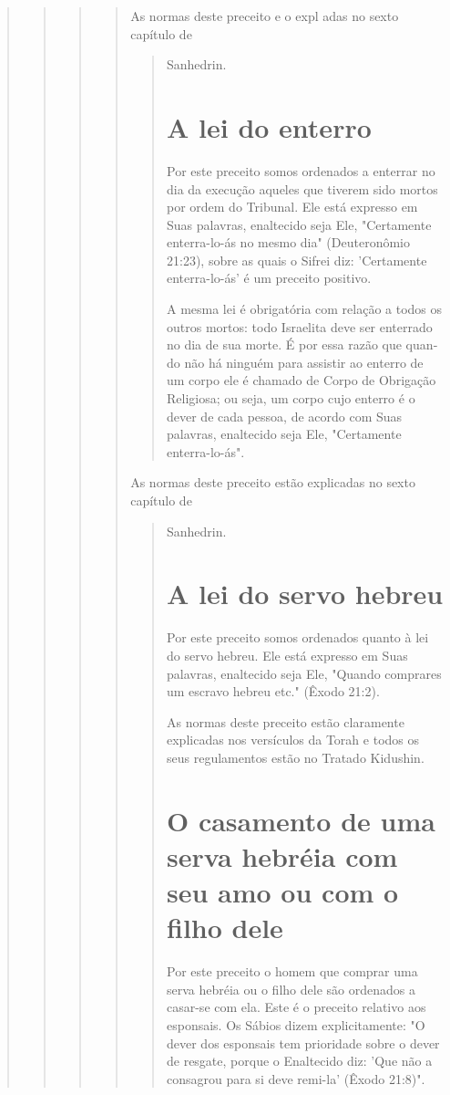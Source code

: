 \begin{quote}
\begin{quote}
\begin{quote}
\begin{quote}
As normas deste preceito e o expl adas no sexto capítulo de

\begin{quote}
Sanhedrin.

\section{A lei do enterro}

Por este preceito somos ordenados a enterrar no dia da execução aqueles
que tiverem sido mortos por ordem do Tribunal. Ele está expresso em Suas
palavras, enaltecido seja Ele, "Certamente enterra-lo-ás no mesmo dia"
(Deuteronômio 21:23), sobre as quais o Sifrei diz: 'Certamente
enterra-lo-ás' é um preceito positivo.

A mesma lei é obrigatória com relação a todos os outros mortos: to­do
Israelita deve ser enterrado no dia de sua morte. É por essa razão que
quan­do não há ninguém para assistir ao enterro de um corpo ele é
chamado de Corpo de Obrigação Religiosa; ou seja, um corpo cujo enterro
é o dever de cada pessoa, de acordo com Suas palavras, enaltecido seja
Ele, "Certamente enterra-lo-ás".
\end{quote}

As normas deste preceito estão explicadas no sexto capítulo de

\begin{quote}
Sanhedrin.

\section{A lei do servo hebreu}

Por este preceito somos ordenados quanto à lei do servo hebreu. Ele está
expresso em Suas palavras, enaltecido seja Ele, "Quando comprares um
escravo hebreu etc." (Êxodo 21:2).

As normas deste preceito estão claramente explicadas nos versícu­los da
Torah e todos os seus regulamentos estão no Tratado Kidushin.

\section{O casamento de uma serva hebréia com seu amo ou com o filho dele}

Por este preceito o homem que comprar uma serva hebréia ou o fi­lho dele
são ordenados a casar-se com ela. Este é o preceito relativo aos
espon­sais. Os Sábios dizem explicitamente: "O dever dos esponsais tem
prioridade sobre o dever de resgate, porque o Enaltecido diz: 'Que não a
consagrou para si deve remi-la' (Êxodo 21:8)".
\end{quote}


\end{quote}
\end{quote}
\end{quote}
\end{quote}
